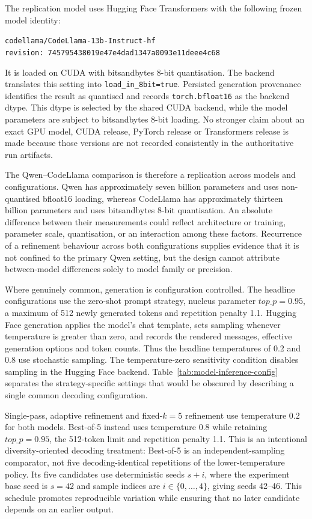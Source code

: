 The replication model uses Hugging Face Transformers with the following frozen model identity:
\begin{center}
    \small\texttt{codellama/CodeLlama-13b-Instruct-hf}\\
    \texttt{revision: 745795438019e47e4dad1347a0093e11deee4c68}
\end{center}
It is loaded on CUDA with bitsandbytes 8-bit quantisation. The backend translates this setting into \texttt{load\_in\_8bit=true}. Persisted generation provenance identifies the result as quantised and records \texttt{torch.bfloat16} as the backend dtype. This dtype is selected by the shared CUDA backend, while the model parameters are subject to bitsandbytes 8-bit loading. No stronger claim about an exact GPU model, CUDA release, PyTorch release or Transformers release is made because those versions are not recorded consistently in the authoritative run artifacts.

The Qwen--CodeLlama comparison is therefore a replication across models and configurations. Qwen has approximately seven billion parameters and uses non-quantised bfloat16 loading, whereas CodeLlama has approximately thirteen billion parameters and uses bitsandbytes 8-bit quantisation. An absolute difference between their measurements could reflect architecture or training, parameter scale, quantisation, or an interaction among these factors. Recurrence of a refinement behaviour across both configurations supplies evidence that it is not confined to the primary Qwen setting, but the design cannot attribute between-model differences solely to model family or precision.

Where genuinely common, generation is configuration controlled. The headline configurations use the zero-shot prompt strategy, nucleus parameter \(\mathit{top\_p}=0.95\), a maximum of 512 newly generated tokens and repetition penalty 1.1. Hugging Face generation applies the model's chat template, sets sampling whenever temperature is greater than zero, and records the rendered messages, effective generation options and token counts. Thus the headline temperatures of 0.2 and 0.8 use stochastic sampling. The temperature-zero sensitivity condition disables sampling in the Hugging Face backend. Table~\ref{tab:model-inference-config} separates the strategy-specific settings that would be obscured by describing a single common decoding configuration.

Single-pass, adaptive refinement and fixed-$k=5$ refinement use temperature 0.2 for both models. Best-of-5 instead uses temperature 0.8 while retaining \(\mathit{top\_p}=0.95\), the 512-token limit and repetition penalty 1.1. This is an intentional diversity-oriented decoding treatment: Best-of-5 is an independent-sampling comparator, not five decoding-identical repetitions of the lower-temperature policy. Its five candidates use deterministic seeds \(s+i\), where the experiment base seed is \(s=42\) and sample indices are \(i\in\{0,\ldots,4\}\), giving seeds 42--46. This schedule promotes reproducible variation while ensuring that no later candidate depends on an earlier output.


